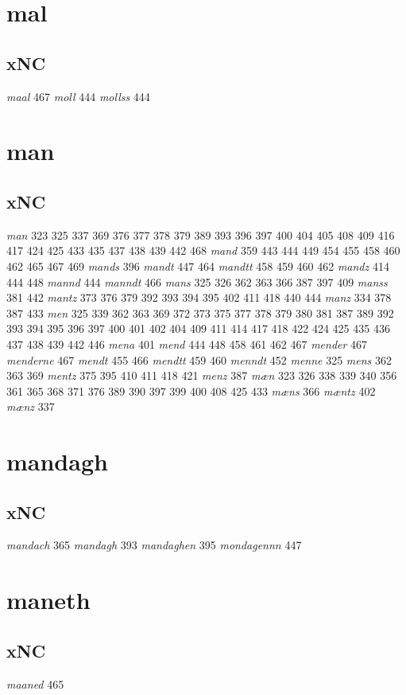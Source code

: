 \documentclass[a4paper,twocolumn]{article}
\begin{document}
\section{mal}
\label{sec:orgda9ce40}
\subsection{xNC}
\label{sec:orgac3f938}
\emph{maal} 467 \emph{moll} 444 \emph{mollss} 444 
\section{man}
\label{sec:orgc1e8e71}
\subsection{xNC}
\label{sec:org554306d}
\emph{man} 323 325 337 369 376 377 378 379 389 393 396 397 400 404 405 408 409 416 417 424 425 433 435 437 438 439 442 468 \emph{mand} 359 443 444 449 454 455 458 460 462 465 467 469 \emph{mands} 396 \emph{mandt} 447 464 \emph{mandtt} 458 459 460 462 \emph{mandz} 414 444 448 \emph{mannd} 444 \emph{manndt} 466 \emph{mans} 325 326 362 363 366 387 397 409 \emph{manss} 381 442 \emph{mantz} 373 376 379 392 393 394 395 402 411 418 440 444 \emph{manz} 334 378 387 433 \emph{men} 325 339 362 363 369 372 373 375 377 378 379 380 381 387 389 392 393 394 395 396 397 400 401 402 404 409 411 414 417 418 422 424 425 435 436 437 438 439 442 446 \emph{mena} 401 \emph{mend} 444 448 458 461 462 467 \emph{mender} 467 \emph{menderne} 467 \emph{mendt} 455 466 \emph{mendtt} 459 460 \emph{menndt} 452 \emph{menne} 325 \emph{mens} 362 363 369 \emph{mentz} 375 395 410 411 418 421 \emph{menz} 387 \emph{mæn} 323 326 338 339 340 356 361 365 368 371 376 389 390 397 399 400 408 425 433 \emph{mæns} 366 \emph{mæntz} 402 \emph{mænz} 337 
\section{mandagh}
\label{sec:orgf6f29df}
\subsection{xNC}
\label{sec:org11f9bb0}
\emph{mandach} 365 \emph{mandagh} 393 \emph{mandaghen} 395 \emph{mondagennn} 447 
\section{maneth}
\label{sec:org54009bf}
\subsection{xNC}
\label{sec:org5f568af}
\emph{maaned} 465 
\end{document}
